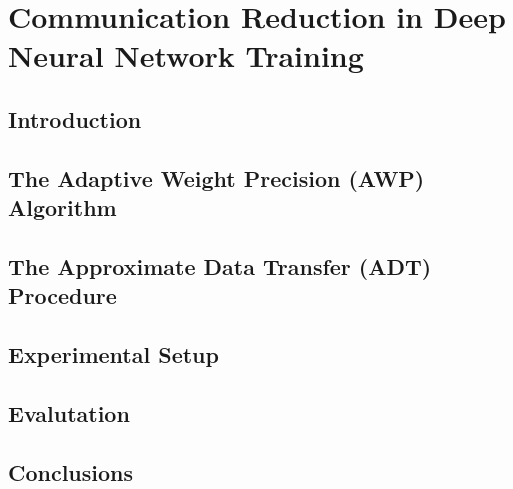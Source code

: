 \chapter{Communication Reduction in Deep Neural Network Training}
\label{chap:bitpack}


\section{Introduction}

\section{The Adaptive Weight Precision (AWP) Algorithm}
\label{sec:bitpack_adaptive}

\section{The Approximate Data Transfer (ADT) Procedure}
\label{sec:bitpack_approx}

\section{Experimental Setup}
\label{sec:bitpack_setup}

\section{Evalutation}
\label{sec:bitpack_evaluation}

\section{Conclusions}
\label{sec:bitpack_conclusion}

